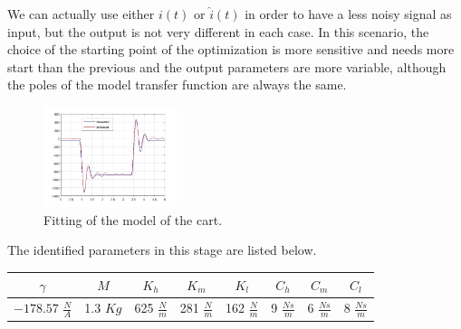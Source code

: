We can actually use either $i(t)$ or $\hat{i}(t)$ in order to have a less noisy signal as input, but the output is not very different in each case. In this scenario, the choice of the starting point of the optimization is more sensitive and needs more start than the previous and the output parameters are more variable, although the poles of the model transfer function are always the same.
\begin{figure}[h]
\centering
\includegraphics[width=0.35\textwidth]{img/graybox_cart.jpg}
\caption{Fitting of the model of the cart.}
\end{figure}

The identified parameters in this stage are listed below.
\def\arraystretch{1.5}
\begin{table}[!h]
\centering
\begin{tabular}{|c|c|c|c|c|c|c|c|}
	\hline
	$\gamma$ & $M$ & $K_h$ & $K_m$ & $K_l$ & $C_h$ & $C_m$ & $C_l$ \\
	\hline 
	$-178.57$ $\frac{N}{A}$ & 1.3 $Kg$ & 625 $\frac{N}{m}$ & 281 $\frac{N}{m}$ & 162 $\frac{N}{m}$ & 9 $\frac{Ns}{m}$ & 6 $\frac{Ns}{m}$ & 8 $\frac{Ns}{m}$\\ \hline
\end{tabular}
\end{table}